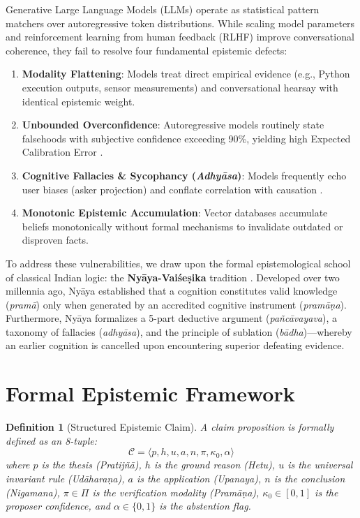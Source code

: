 \documentclass[11pt,a4paper]{article}
\newtheorem{definition}{Definition}
\begin{document}
Generative Large Language Models (LLMs) operate as statistical pattern matchers over autoregressive token distributions. While scaling model parameters and reinforcement learning from human feedback (RLHF) improve conversational coherence, they fail to resolve four fundamental epistemic defects:
\begin{enumerate}[leftmargin=*]
    \item \textbf{Modality Flattening}: Models treat direct empirical evidence (e.g., Python execution outputs, sensor measurements) and conversational hearsay with identical epistemic weight.
    \item \textbf{Unbounded Overconfidence}: Autoregressive models routinely state falsehoods with subjective confidence exceeding 90\%, yielding high Expected Calibration Error \citep{guo2017calibration}.
    \item \textbf{Cognitive Fallacies \& Sycophancy (\textit{Adhy\=asa})}: Models frequently echo user biases (asker projection) and conflate correlation with causation \citep{perez2022discovering,sharma2023sycophancy}.
    \item \textbf{Monotonic Epistemic Accumulation}: Vector databases accumulate beliefs monotonically without formal mechanisms to invalidate outdated or disproven facts.
\end{enumerate}

To address these vulnerabilities, we draw upon the formal epistemological school of classical Indian logic: the \textbf{Ny\=aya-Vai\'se\d{s}ika} tradition \citep{matilal1986perception,mohanty2000classical}. Developed over two millennia ago, Ny\=aya established that a cognition constitutes valid knowledge (\textit{pram\=a}) only when generated by an accredited cognitive instrument (\textit{pram\=a\d{n}a}). Furthermore, Ny\=aya formalizes a 5-part deductive argument (\textit{pa\~nc\=avayava}), a taxonomy of fallacies (\textit{adhy\=asa}), and the principle of sublation (\textit{b\=adha})---whereby an earlier cognition is cancelled upon encountering superior defeating evidence.

\section{Formal Epistemic Framework}

\begin{definition}[Structured Epistemic Claim]
A claim proposition is formally defined as an 8-tuple:
\begin{equation}
\mathcal{C} = \langle p, h, u, a, n, \pi, \kappa_0, \alpha \rangle
\end{equation}
where $p$ is the thesis (\textit{Pratij\~n\=a}), $h$ is the ground reason (\textit{Hetu}), $u$ is the universal invariant rule (\textit{Ud\=ahara\d{n}a}), $a$ is the application (\textit{Upanaya}), $n$ is the conclusion (\textit{Nigamana}), $\pi \in \Pi$ is the verification modality (\textit{Pram\=a\d{n}a}), $\kappa_0 \in [0, 1]$ is the proposer confidence, and $\alpha \in \{0, 1\}$ is the abstention flag.
\end{definition}
\end{document}
